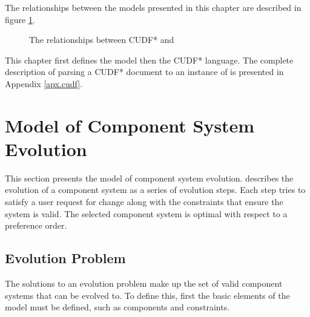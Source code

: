 The relationships between the models presented in this chapter are described in figure \ref{formal.modeldiagram}.
\begin{figure}[htp]
\begin{center}
  \caption{The relationships between CUDF* and \modelname}
  \label{formal.modeldiagram}
\end{center}
\end{figure}

This chapter first 
defines the \modelname model then the CUDF* language.
The complete description of parsing a CUDF* document to an instance of \modelname is presented in Appendix \ref{apx.cudf}.
 
\section{\modelname Model of Component System Evolution}
\label{formal.step}
This section presents the \modelname model of component system evolution. 
\modelname describes the evolution of a component system as a series of evolution steps.
Each step tries to satisfy a user request for change along with the constraints that ensure the system is valid.
The selected component system is optimal with respect to a preference order.

\subsection{Evolution Problem}
The solutions to an evolution problem make up the set of valid component systems that can be evolved to.
To define this, first the basic elements of the model must be defined, such as components and constraints. 

